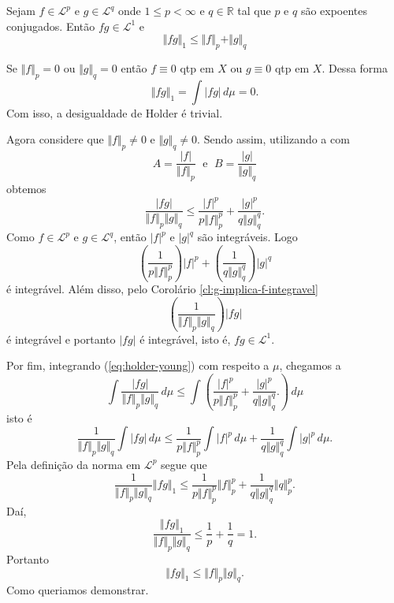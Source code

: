 \documentclass[a4paper, 11pt]{book}
\theoremstyle{definition}
\newcommand{\bR}{\mathbb{R}}
\newcommand{\cL}{\mathcal{L}}
\begin{document}
\begin{tbox} \label{thm:desigualdade-de-holder}
    Sejam $f \in \cL^p$ e $g \in \cL^q$ onde $1 \leqslant p < \infty$ e $q \in \bR$ tal que $p$ e $q$ são expoentes conjugados.
    Então $fg \in \cL^1$ e
    \[
        \Vert fg \Vert_1 \leqslant \Vert f \Vert_p + \Vert g \Vert_q
    \]
\end{tbox}
\begin{prf}
    Se $\Vert f \Vert_p = 0$ ou $\Vert g \Vert_q = 0$ então $f \equiv 0$ qtp em $X$ ou $g \equiv 0$ qtp em $X$. Dessa forma
    \[
        \Vert fg \Vert_1 = \int |fg| \,d\mu = 0.
    \]
    Com isso, a desigualdade de Holder é trivial.

    Agora considere que $\Vert f \Vert_p \neq 0$ e $\Vert g \Vert_q \neq 0$. Sendo assim, utilizando a  com
    \[
        A = \frac{|f|}{\Vert f \Vert_p} \;\text{ e }\; B = \frac{|g|}{\Vert g \Vert_q}
    \]
    obtemos
    \begin{equation} \label{eq:holder-young}
        \frac{|fg|}{\Vert f \Vert_p \Vert g \Vert_q}\leqslant \frac{|f|^p}{p \Vert f \Vert_p^p} + \frac{|g|^p}{q \Vert g \Vert_q^q}.
    \end{equation}
    Como $f \in \cL^p$ e $g \in \cL^q$, então $|f|^p$ e $|g|^q$ são integráveis.
    Logo
    \[
        \left( \frac{1}{p \Vert f \Vert_p^p} \right) |f|^p + \left( \frac{1}{q \Vert g \Vert_q^q} \right) |g|^q
    \]
    é integrável.
    Além disso, pelo Corolário \ref{cl:g-implica-f-integravel}
    \[
        \left( \frac{1}{\Vert f \Vert_p \Vert g \Vert_q} \right) |fg|
    \]
    é integrável e portanto $|fg|$ é integrável, isto é, $fg \in \cL^1$.

    Por fim, integrando (\ref{eq:holder-young}) com respeito a $\mu$, chegamos a
    \[
        \int \frac{|fg|}{\Vert f \Vert_p \Vert g \Vert_q} \,d\mu \leqslant \int \left( \frac{|f|^p}{p \Vert f \Vert_p^p} + \frac{|g|^p}{q \Vert g \Vert_q^q}. \right) \, d\mu
    \]
    isto é
    \[
        \frac{1}{\Vert f \Vert_p \Vert g \Vert_q} \int |fg| \,d\mu \leqslant \frac{1}{p \Vert f \Vert_p^p} \int |f|^p \,d\mu + \frac{1}{q \Vert g \Vert_q^q}\int |g|^p \,d\mu.
    \]
    Pela definição da norma em $\cL^p$ segue que
    \[
        \frac{1}{\Vert f \Vert_p \Vert g \Vert_q} \Vert fg \Vert_1 \leqslant \frac{1}{p \Vert f \Vert_p^p} \Vert f \Vert_p^p + \frac{1}{q \Vert g \Vert_q^q} \Vert q \Vert_p^p.
    \]
    Daí,
    \[
        \frac{\Vert fg \Vert_1}{\Vert f \Vert_p \Vert g \Vert_q} \leqslant \frac{1}{p} + \frac{1}{q} = 1.
    \]
    Portanto
    \[
        \Vert fg \Vert_1 \leqslant \Vert f \Vert_p \Vert g \Vert_q.
    \]
    Como queriamos demonstrar.
\end{prf}
\end{document}
